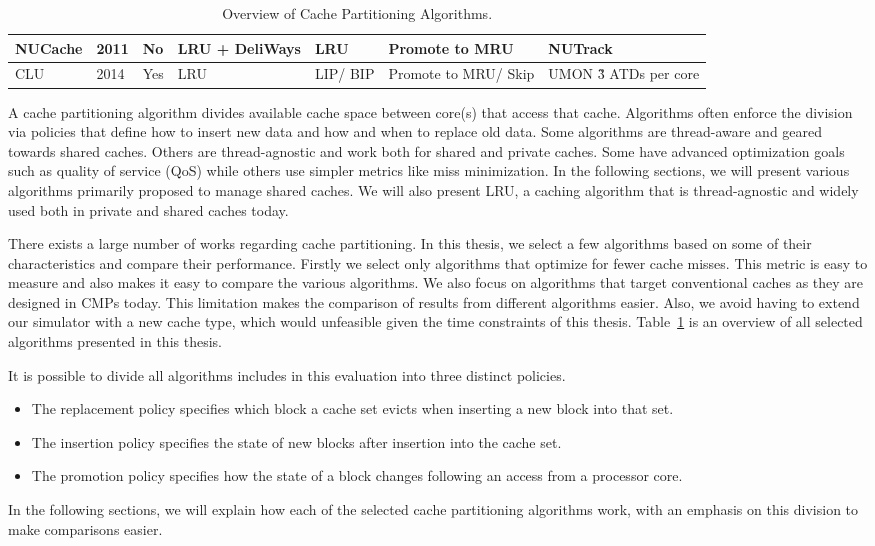 \begin{table}[!htb]
\begin{tabular}{|p{1.0cm}|p{0.5cm}|p{0.8cm}|p{1.2cm}|p{1.2cm}|p{1.2cm}|p{1.2cm}|}
NUCache                         & 2011                           & No                          & LRU + DeliWays     & LRU                            & Promote to MRU                 & NUTrack                               \\ \hline
CLU                             & 2014                           & Yes                         & LRU                              & LIP/ BIP                        & Promote to MRU/ Skip            & UMON \~3 ATDs per core                 \\ \hline
\end{tabular}
\caption{Overview of Cache Partitioning Algorithms.}
\label{tbl:algorithms}
\end{table}

A cache partitioning algorithm divides available cache space between core(s) that access that cache.
Algorithms often enforce the division via policies that define how to insert new data and how and when to replace old data.
Some algorithms are thread-aware and geared towards shared caches.
Others are thread-agnostic and work both for shared and private caches.
Some have advanced optimization goals such as quality of service (QoS) while others use simpler metrics like miss minimization.
In the following sections, we will present various algorithms primarily proposed to manage shared caches.
We will also present LRU, a caching algorithm that is thread-agnostic and widely used both in private and shared caches today.

There exists a large number of works regarding cache partitioning. 
In this thesis, we select a few algorithms based on some of their characteristics and compare their performance.
Firstly we select only algorithms that optimize for fewer cache misses.
This metric is easy to measure and also makes it easy to compare the various algorithms.
We also focus on algorithms that target conventional caches as they are designed in CMPs today.
This limitation makes the comparison of results from different algorithms easier.
Also, we avoid having to extend our simulator with a new cache type, which would unfeasible given the time constraints of this thesis.
Table~\ref{tbl:algorithms} is an overview of all selected algorithms presented in this thesis.

It is possible to divide all algorithms includes in this evaluation into three distinct policies.
\begin{itemize}
\item The replacement policy specifies which block a cache set evicts when inserting a new block into that set.
\item The insertion policy specifies the state of new blocks after insertion into the cache set.
\item The promotion policy specifies how the state of a block changes following an access from a processor core.
\end{itemize}
In the following sections, we will explain how each of the selected cache partitioning algorithms work, with an emphasis on this division to make comparisons easier.











